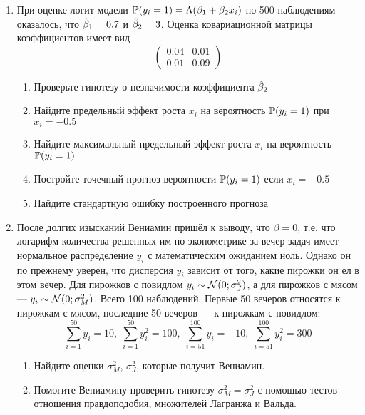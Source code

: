 \documentclass[12pt]{article}
\begin{document}
\begin{enumerate}
\item При оценке логит модели
\(
\P(y_i=1)=\Lambda(\b_1+\b_2 x_i)
\)
по 500 наблюдениям оказалось, что $\hb_1=0.7$ и $\hb_2=3$. Оценка ковариационной матрицы коэффициентов имеет вид
\[
\begin{pmatrix}
  0.04 & 0.01 \\
  0.01 & 0.09
\end{pmatrix}
\]

\begin{enumerate}
\item Проверьте гипотезу о незначимости коэффициента $\hb_2$
\item Найдите предельный эффект роста $x_i$ на вероятность $\P(y_i=1)$ при $x_i=-0.5$
\item Найдите максимальный предельный эффект роста $x_i$ на вероятность $\P(y_i=1)$
\item Постройте точечный прогноз вероятности $\P(y_i=1)$ если $x_i = -0.5$
\item Найдите стандартную ошибку построенного прогноза
\end{enumerate}

\item После долгих изысканий Вениамин пришёл к выводу, что $\beta=0$, т.е. что логарифм количества решенных им по эконометрике за вечер задач имеет нормальное распределение $y_i$ с математическим ожиданием ноль. Однако он по прежнему уверен, что дисперсия $y_i$ зависит от того, какие пирожки он ел в этом вечер. Для пирожков с повидлом $y_i \sim \cN(0;\sigma^2_J)$, а для пирожков с мясом --- $y_i\sim \cN(0;\sigma^2_M)$. Всего 100 наблюдений. Первые 50 вечеров относятся к пирожкам с мясом, последние 50 вечеров --- к пирожкам с повидлом:
\[
\sum_{i=1}^{50} y_i = 10, \; \sum_{i=1}^{50} y_i^2 = 100, \;
\sum_{i=51}^{100} y_i = -10, \; \sum_{i=51}^{100} y_i^2 = 300
\]
\begin{enumerate}
\item Найдите оценки $\sigma^2_M$, $\sigma^2_J$, которые получит Вениамин.
\item Помогите Вениамину проверить гипотезу $\sigma^2_M = \sigma^2_J$ с помощью тестов отношения правдоподобия, множителей Лагранжа и Вальда.
\end{enumerate}

\end{enumerate}
\end{document}
